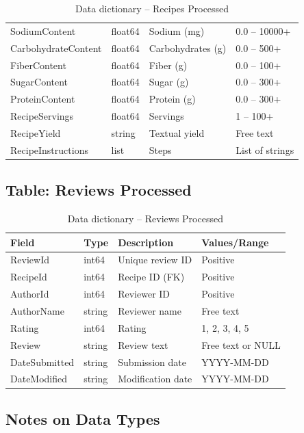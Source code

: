\documentclass[11pt,a4paper]{article}
\begin{document}
\begin{table}[H]
\begin{tabular}{llp{4cm}p{3cm}}
SodiumContent & float64 & Sodium (mg) & 0.0 -- 10000+ \\
CarbohydrateContent & float64 & Carbohydrates (g) & 0.0 -- 500+ \\
FiberContent & float64 & Fiber (g) & 0.0 -- 100+ \\
SugarContent & float64 & Sugar (g) & 0.0 -- 300+ \\
ProteinContent & float64 & Protein (g) & 0.0 -- 300+ \\
RecipeServings & float64 & Servings & 1 -- 100+ \\
RecipeYield & string & Textual yield & Free text \\
RecipeInstructions & list & Steps & List of strings \\
\bottomrule
\end{tabular}
\caption{Data dictionary -- Recipes Processed}
\label{tab:dict_recipes}
\end{table}

\subsection{Table: Reviews Processed}

\begin{table}[H]
\centering
\begin{tabular}{llp{5cm}p{3cm}}
\toprule
\textbf{Field} & \textbf{Type} & \textbf{Description} & \textbf{Values/Range} \\
\midrule
ReviewId & int64 & Unique review ID & Positive \\
RecipeId & int64 & Recipe ID (FK) & Positive \\
AuthorId & int64 & Reviewer ID & Positive \\
AuthorName & string & Reviewer name & Free text \\
Rating & int64 & Rating & 1, 2, 3, 4, 5 \\
Review & string & Review text & Free text or NULL \\
DateSubmitted & string & Submission date & YYYY-MM-DD \\
DateModified & string & Modification date & YYYY-MM-DD \\
\bottomrule
\end{tabular}
\caption{Data dictionary -- Reviews Processed}
\label{tab:dict_reviews}
\end{table}

\subsection{Notes on Data Types}
\end{document}
